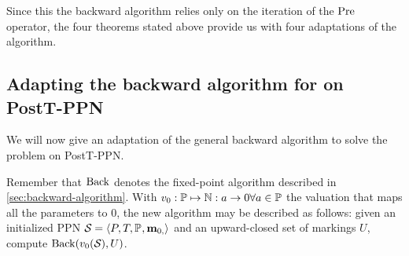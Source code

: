 %
%
%

Since this the backward algorithm relies only on the iteration of the $\operatorname{Pre}$ operator, the four theorems stated above provide us with four adaptations of the algorithm.

\subsection{Adapting the backward algorithm for \Ucov on PostT-\ac{PPN}}

We will now give an adaptation of the general backward algorithm to solve the \Ucov problem on PostT-\ac{PPN}.

Remember that $\operatorname{Back}$ denotes the fixed-point algorithm described in \cref{sec:backward-algorithm}.
With $v_0 : \mathbb{P} \mapsto \mathbb{N} : a \rightarrow 0 \forall a \in \mathbb{P}$ the valuation that maps all the parameters to 0, the new algorithm may be described as follows:
given an initialized \ac{PPN} $\mathcal{S}_{{}} = \left\langle P_{}, T_{}, \mathbb{P}_{}, \mathbf{m}_{0,}\right\rangle$ and an upward-closed set of markings $U$, compute $\operatorname{Back}(v_0(\mathcal{S}_{{}}), U)$.

